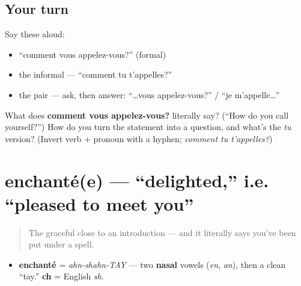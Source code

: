 \subsection*{Your turn}
Say these aloud:

\begin{itemize}
\raggedright
  \item \textquotedblleft{}comment vous appelez-vous?\textquotedblright{} (formal)
  \item the informal — \textquotedblleft{}comment tu t'appelles?\textquotedblright{}
  \item the pair — ask, then answer: \textquotedblleft{}…vous appelez-vous?\textquotedblright{} / \textquotedblleft{}je m'appelle…\textquotedblright{}
\end{itemize}

\begin{tcolorbox}[breakable,colback=teal!4,colframe=teal!35!black,title={Before you move on}]
What does \textbf{comment vous appelez-vous?} literally say? (\textquotedblleft{}How do you call yourself?\textquotedblright{}) How do you turn the statement into a question, and what's the \emph{tu} version? (Invert verb + pronoun with a hyphen; \emph{comment tu t'appelles?})
\end{tcolorbox}
\section[enchanté(e)]{enchanté(e) — \textquotedblleft{}delighted,\textquotedblright{} i.e. \textquotedblleft{}pleased to meet you\textquotedblright{}}

\label{lesson:FR-C02-enchante}



\begin{quote}
The graceful close to an introduction — and it literally says you've been put under a spell.
\end{quote}

\begin{sounds}
\begin{itemize}
\raggedright
  \item \textbf{enchanté} = \emph{ahn-shahn-TAY} — two \textbf{nasal} vowels (\emph{en}, \emph{an}), then a clean \textquotedblleft{}tay.\textquotedblright{} \textbf{ch} = English \emph{sh}.
\end{itemize}
\end{sounds}

